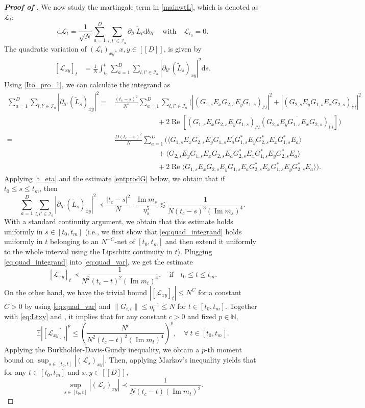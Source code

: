 \documentclass[10pt,reqno]{amsart}
\numberwithin{equation}{section}
\numberwithin{figure}{section}
\theoremstyle{plain} %
\theoremstyle{definition} %
\newcommand{\cal}{\mathcal}
\newcommand{\wt}{\widetilde}
\newcommand{\N}{\mathbb{N}}
\newcommand{\dd}{\mathrm{d}}
\newcommand{\qq}[1]{[\![{#1}]\!]}
\newcommand{\pa}[1]{\left({#1}\right)}
\DeclareMathOperator{\re}{\mathrm{Re}}
\DeclareMathOperator{\im}{\mathrm{Im}}
\newcommand{\be}{\begin{equation}}
\newcommand{\ee}{\end{equation}}
\newcommand{\kk}{l'}
\numberwithin{equation}{section}
\begin{document}
\begin{proof}[\bf Proof of ]
 We now study the martingale term in \eqref{mainwtL}, which is denoted as $\cal L_t$: 
$$ \dd\mathcal{L}_t= \frac{1}{\sqrt{N}}\sum_{a=1}^D\sum_{l,\kk\in\cal I_a}\partial_{l\kk}\wt L_{t}\dd b_{l\kk} \quad \text{with}\quad \cal L_{t_0}=0.
$$
The quadratic variation of $(\cal L_t)_{xy}$, $x,y \in \qq D$, is given by
\begin{align}\label{eq:quad_var}
[ \cal L_{xy}]_t &= \frac{1}{N}\int_{t_0}^t \sum_{a=1}^D\sum_{l,\kk\in\cal I_a}|\partial_{l\kk}(\wt L_s)_{xy}|^2\dd s.
\end{align}
Using \eqref{Ito_pro_1}, we can calculate the integrand as
\begin{align*}
\sum_{a=1}^D\sum_{l,\kk\in\cal I_a}|\partial_{l\kk}(\wt L_s)_{xy}|^2  =& \frac{(t_c-s)^2}{N^2}\sum_{a=1}^D\sum_{l,\kk\in\cal I_a}\Big(\left|(G_{1,s}E_xG_{2,s}E_yG_{1,s})_{\kk l}\right|^2 + \left|(G_{2,s}E_yG_{1,s}E_xG_{2,s})_{\kk l}\right|^2\\
&\qquad \qquad \qquad + 2\re\left[(G_{1,s}E_xG_{2,s}E_yG_{1,s})_{\kk l}\overline{(G_{2,s}E_yG_{1,s}E_xG_{2,s})_{\kk l}}\right]\Big)\\
=& \frac{D(t_c-s)^2}{N }\sum_{a=1}^D \Big( \langle G_{1,s}E_xG_{2,s}E_yG_{1,s}E_aG_{1,s}^*E_yG_{2,s}^*E_xG_{1,s}^*E_a\rangle\\
&\qquad \qquad \qquad +  \langle G_{2,s}E_yG_{1,s}E_xG_{2,s}E_aG_{2,s}^*E_xG_{1,s}^*E_yG_{2,s}^*E_a\rangle\\
&\qquad \qquad \qquad + 2 \re\langle G_{1,s}E_xG_{2,s}E_yG_{1,s}E_aG_{2,s}^*E_xG_{1,s}^*E_yG_{2,s}^*E_a\rangle\Big).
\end{align*}
Applying \eqref{t_eta} and the estimate \eqref{entprodG} below, we obtain that if $t_0 \le s \le t_m$, then
\be\label{eq:quad_integrand}
\sum_{a=1}^D\sum_{l,\kk\in\cal I_a}|\partial_{l\kk}(\wt L_s)_{xy}|^2  \prec \frac{|t_c-s|^2}{N }\cdot \frac{\im m_s}{\eta_s^5} \lesssim \frac{1}{N(t_c-s)^3\pa{\im m_s}^4} .
\ee
With a standard continuity argument, we obtain that this estimate holds uniformly in $s\in [t_0 , t_m]$ (i.e., we first show that \eqref{eq:quad_integrand} holds uniformly in $t$ belonging to an $N^{-C}$-net of $[t_0 , t_m]$ and then extend it uniformly to the whole interval using the Lipschitz continuity in $t$). Plugging \eqref{eq:quad_integrand} into \eqref{eq:quad_var}, we get the estimate
\be\label{eq:Ltxy}
[ \cal L_{xy}]_t  \prec \frac{1}{N^2(t_c-t)^2\pa{\im m_t}^4}, \quad \text{if}\quad t_0 \le t \le t_m.
\ee
On the other hand, we have the trivial bound $|[ \cal L_{xy}]_t |\le N^C$ for a constant $C>0$ by using \eqref{eq:quad_var} and $\|G_{i,t}\|\le \eta_t^{-1} \le N$ for $t\in [t_0 , t_m]$. Together with \eqref{eq:Ltxy} and , it implies that for any constant $c>0$ and fixed $p\in \N$,
\[\mathbb E \left|[ \cal L_{xy}]_t\right|^p \le \left(\frac{N^c}{N^2(t_c-t)^2\pa{\im m_t}^4}\right)^p, \quad \forall \ t \in [t_0 , t_m]. \]
Applying the Burkholder-Davis-Gundy inequality, we obtain a $p$-th moment bound on $\sup_{s\in[ t_0,t] }\left|(\cal L_s)_{xy}\right|$. Then, applying Markov's inequality yields that for any $t\in [t_0 , t_m]$ and $x,y \in \qq D$,
\be\label{CIest}
\sup_{s\in[ t_0,t] }\left|(\cal L_s)_{xy}\right| \prec \frac{1}{  N(t_c-t)\pa{\im m_t}^2 }.
\ee


\end{proof}
\end{document}

